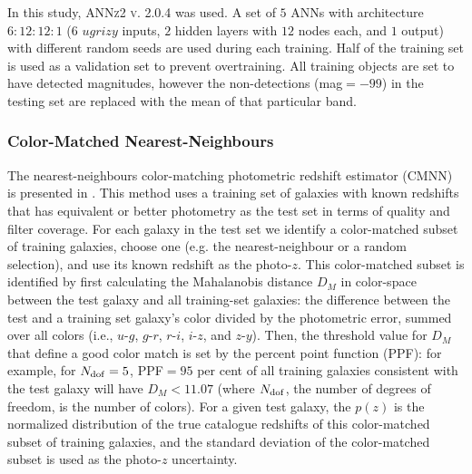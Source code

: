 In this study, \textsc{ANNz2 v. 2.0.4} was used. A set of $5$ ANNs with architecture $6:12:12:1$ ($6$ $ugrizy$ inputs, $2$ hidden layers with $12$ nodes each, and $1$ output) with different random seeds are used during each training. %
Half of the training set is used as a validation set to prevent overtraining. All training objects are set to have detected magnitudes, however the non-detections (mag$=-99$) in the testing set are replaced with the mean of that particular band.


\subsubsection{Color-Matched Nearest-Neighbours}
\label{sec:cmnn}

The nearest-neighbours color-matching photometric redshift estimator (\textsc{CMNN}) is presented in \citet[][herafter G18]{Graham:17}. This method uses a training set of galaxies with known redshifts that has equivalent or better photometry as the test set in terms of quality and filter coverage. For each galaxy in the test set we identify a color-matched subset of training galaxies, choose one (e.g. the nearest-neighbour or a random selection), and use its known redshift as the photo-$z$. This color-matched subset is identified by first calculating the Mahalanobis distance $D_M$ in color-space between the test galaxy and all training-set galaxies: the difference between the test and a training set galaxy's color divided by the photometric error, summed over all colors (i.e., $u$-$g$, $g$-$r$, $r$-$i$, $i$-$z$, and $z$-$y$). Then, the threshold value for $D_M$ that define a good color match is set by the percent point function (PPF): for example, for $N_{\rm dof}=5$, PPF$=95$ per cent of all training galaxies consistent with the test galaxy will have $D_M < 11.07$ (where $N_{\rm dof}$, the number of degrees of freedom, is the number of colors). For a given test galaxy, the $p(z)$ is the normalized distribution of the true catalogue redshifts of this color-matched subset of training galaxies, and the standard deviation of the color-matched subset is used as the photo-$z$ uncertainty.

